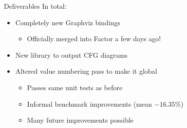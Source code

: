 \documentclass{beamer}
\begin{document}
\begin{frame}{Deliverables}
  In total:
  \begin{itemize}
    \item Completely new Graphviz bindings
    \begin{itemize}
      \item Officially merged into Factor a few days ago!
    \end{itemize}
    \item New library to output CFG diagrams
    \item Altered value numbering pass to make it global
    \begin{itemize}
      \item Passes same unit tests as before
      \item Informal benchmark improvements (mean $-16.35\%$)
      \item Many future improvements possible
    \end{itemize}
  \end{itemize}
\end{frame}

\end{document}
